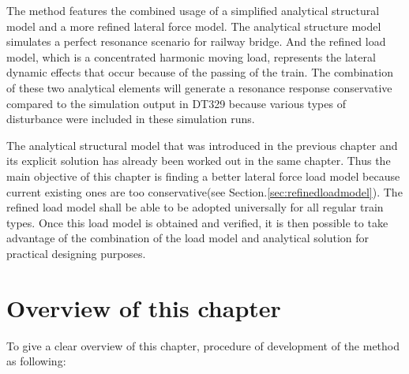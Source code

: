 The method features the combined usage of a simplified analytical structural model and a more refined lateral force model. The analytical structure model simulates a perfect resonance scenario for railway bridge. And the refined load model, which is a concentrated harmonic moving load, represents the lateral dynamic effects that occur because of the passing of the train. The combination of these two analytical elements will generate a resonance response conservative compared to the simulation output in DT329 because various types of disturbance were included in these simulation runs.

The analytical structural model that was introduced in the previous chapter and its explicit solution has already been worked out in the same chapter. Thus the main objective of this chapter is finding a better lateral force load model because current existing ones are too conservative(see Section.\ref{sec:refinedloadmodel}). The refined load model shall be able to be adopted universally for all regular train types. Once this load model is obtained and verified, it is then possible to take advantage of the combination of the load model and analytical solution for practical designing purposes.

\section{Overview of this chapter}

To give a clear overview of this chapter, procedure of development of the method  as following:

